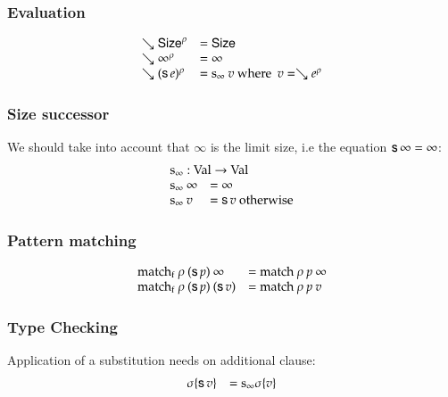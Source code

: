 \subsubsection{Evaluation}

\[
\begin{array}{ll}
\searrow \mathsf{Size}^{\rho} & = \mathsf{Size} \\
\searrow \infty^{\rho} & = \infty  \\
\searrow (\mathsf{s}\, e)^{\rho} & = \mathrm{s_{\infty}} \: v \mbox{ where } \: v = \searrow e^{\rho} \\ 
\end{array}
\]

\subsubsection{Size successor}
We should take into account that $\infty$ is the limit size, i.e the equation $\mathsf{s}\, \infty = \infty$:
\[
\begin{array}[t]{ll}
\multicolumn{2}{l}{\sinfty : \Val \ra \Val}\\ 
\sinfty \: \infty & = \infty\\
\sinfty \:  v & = \s v  \mbox{ otherwise}\\ 
\end{array}
\]

\subsubsection{Pattern matching}
\[
\begin{array}{ll}
\mathrm{match_f} \: \rho \: (\mathsf{s}\, p) \: \infty & = \mathrm{match} \: \rho \: p \: \infty \\
\mathrm{match_f} \: \rho \: (\mathsf{s}\, p) \: (\mathsf{s}\, v) & = \mathrm{match} \: \rho \: p \: v \\
\end{array}
\]

\subsubsection{Type Checking}

Application of a substitution needs on additional clause:
\[
\begin{array}{ll}
\sigma\{\mathsf{s}\, v\} & = \mathrm{s_{\infty}} \sigma\{v\} \\
\end{array}
\]


